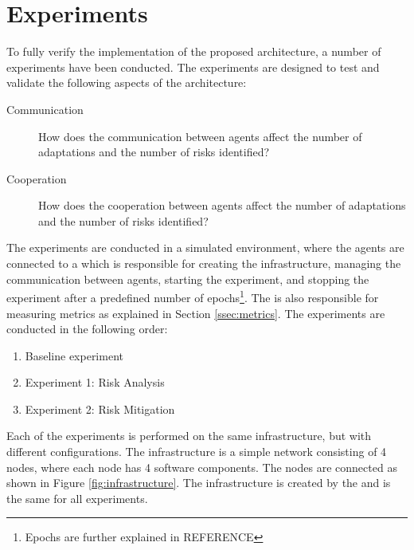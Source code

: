 \section{Experiments}
\label{sec:experiments}

To fully verify the implementation of the proposed architecture, a number of experiments have been conducted. The experiments are designed to test and validate the following aspects of the architecture: 

\begin{description}
    \item[Communication] How does the communication between agents affect the number of adaptations and the number of risks identified?
    \item[Cooperation] How does the cooperation between agents affect the number of adaptations and the number of risks identified?
\end{description}

The experiments are conducted in a simulated environment, where the agents are connected to a  which is responsible for creating the infrastructure, managing the communication between agents, starting the experiment, and stopping the experiment after a predefined number of epochs\footnote{Epochs are further explained in REFERENCE}. The  is also responsible for measuring metrics as explained in Section \ref{ssec:metrics}. The experiments are conducted in the following order:

\begin{enumerate}
    \item Baseline experiment
    \item Experiment 1: Risk Analysis 
    \item Experiment 2: Risk Mitigation 
\end{enumerate}

Each of the experiments is performed on the same infrastructure, but with different configurations.  The infrastructure is a simple network consisting of 4 nodes, where each node has 4 software components. The nodes are connected as shown in Figure \ref{fig:infrastructure}. The infrastructure is created by the  and is the same for all experiments.

